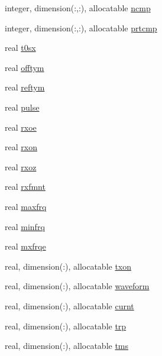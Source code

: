 \begin{DoxyCompactItemize}
\item 
integer, dimension(\+:,\+:), allocatable \hyperlink{namespacemg__input__routines_a22d278bfaca850a0ab774373e78661ec}{ncmp}
\item 
integer, dimension(\+:,\+:), allocatable \hyperlink{namespacemg__input__routines_a2d4f6b1d77d6d39073787c5ef8610846}{prtcmp}
\item 
real \hyperlink{namespacemg__input__routines_aba5372049608986433b213c29131ae76}{t0sx}
\item 
real \hyperlink{namespacemg__input__routines_ae941a66d7f6ae56bb10804012c7ea83d}{offtym}
\item 
real \hyperlink{namespacemg__input__routines_a356426671d63fb59083bb2889f3ce32d}{reftym}
\item 
real \hyperlink{namespacemg__input__routines_afd964e2708e277d0de51b48b4d63bb2c}{pulse}
\item 
real \hyperlink{namespacemg__input__routines_a643bde30769902c6e7548b67f8e3d757}{rxoe}
\item 
real \hyperlink{namespacemg__input__routines_aac35589daa373684efc6c14b17bc0982}{rxon}
\item 
real \hyperlink{namespacemg__input__routines_a9bff6494d3f3462d52b9610d0fd487a8}{rxoz}
\item 
real \hyperlink{namespacemg__input__routines_ac04bfd59cec92c926f5c20864cb615ad}{rxfmnt}
\item 
real \hyperlink{namespacemg__input__routines_a9c6fc602bbc9b8c29310af346d80ad74}{maxfrq}
\item 
real \hyperlink{namespacemg__input__routines_a0c365e2dbdbd75369df81405c3e5667f}{minfrq}
\item 
real \hyperlink{namespacemg__input__routines_a0af8fff8410098941c2a2c06279fad18}{mxfrqe}
\item 
real, dimension(\+:), allocatable \hyperlink{namespacemg__input__routines_ade148d83ae4d8481d6083be159888b3e}{txon}
\item 
real, dimension(\+:), allocatable \hyperlink{namespacemg__input__routines_ad7cf9f6ffae9fd91b7d6d29ffada4978}{waveform}
\item 
real, dimension(\+:), allocatable \hyperlink{namespacemg__input__routines_ad16e03a98826653c76c46073ce55bf5c}{curnt}
\item 
real, dimension(\+:), allocatable \hyperlink{namespacemg__input__routines_aad565f885af40eb427c94718418eacd0}{trp}
\item 
real, dimension(\+:), allocatable \hyperlink{namespacemg__input__routines_a23536c19317019a59a4edd6d333473c8}{tms}

\end{DoxyCompactItemize}
